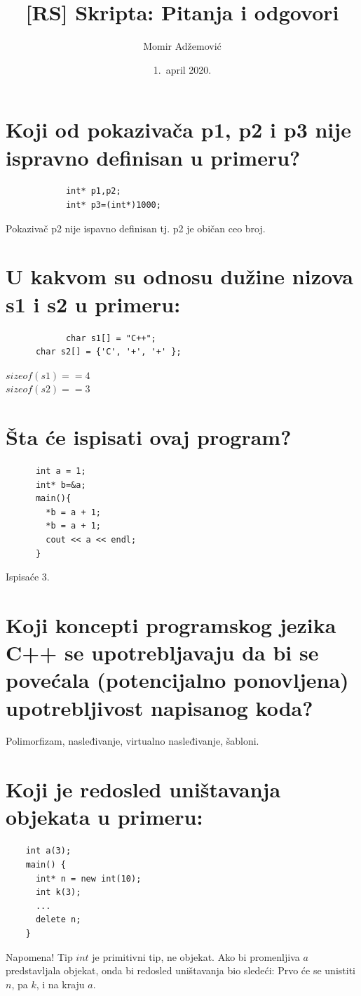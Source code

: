 \documentclass[a4paper]{article}
\begin{document}
\title{[RS] Skripta: Pitanja i odgovori}

\author{Momir Adžemović}

\date{1.~april 2020.}

\maketitle

\tableofcontents

\section{Koji od pokazivača p1, p2 i p3 nije ispravno definisan u primeru?}
		 \begin{lstlisting}
			int* p1,p2;
			int* p3=(int*)1000;\end{lstlisting}
		Pokazivač p2 nije ispavno definisan tj. p2 je običan ceo broj.

\section{U kakvom su odnosu dužine nizova s1 i s2 u primeru:}
		\begin{lstlisting}
			char s1[] = "C++";
      char s2[] = {'C', '+', '+' };\end{lstlisting}
      $sizeof(s1) == 4$\\
      $sizeof(s2) == 3$
    
\section{Šta će ispisati ovaj program?}
    \begin{lstlisting}
      int a = 1;
      int* b=&a;
      main(){
        *b = a + 1;
        *b = a + 1;
        cout << a << endl;
      }\end{lstlisting}

    Ispisaće 3.

\section{Koji koncepti programskog jezika C++ se upotrebljavaju da bi se 
         povećala (potencijalno ponovljena) upotrebljivost napisanog koda?}
    Polimorfizam, nasleđivanje, virtualno nasleđivanje, šabloni.

\section{Koji je redosled uništavanja objekata u primeru:}
    \begin{lstlisting}
    int a(3);
    main() {
      int* n = new int(10);
      int k(3);
      ...
      delete n;
    }\end{lstlisting}
    Napomena! Tip $int$ je primitivni tip, ne objekat. Ako bi promenljiva $a$ predstavljala objekat, 
    onda bi redosled uništavanja bio sledeći: Prvo će se unistiti $n$, pa $k$, i na kraju $a$.
\end{document}

